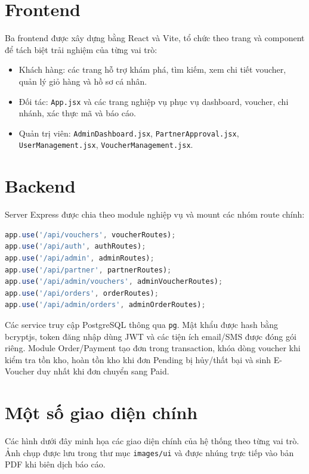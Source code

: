 \section{Frontend}

Ba frontend được xây dựng bằng React và Vite, tổ chức theo trang và component để tách biệt trải nghiệm của từng vai trò:

\begin{itemize}[leftmargin=1.2cm]
    \item Khách hàng: các trang hỗ trợ khám phá, tìm kiếm, xem chi tiết voucher, quản lý giỏ hàng và hồ sơ cá nhân.
    \item Đối tác: \texttt{App.jsx} và các trang nghiệp vụ phục vụ dashboard, voucher, chi nhánh, xác thực mã và báo cáo.
    \item Quản trị viên: \texttt{AdminDashboard.jsx}, \texttt{PartnerApproval.jsx}, \texttt{UserManagement.jsx}, \texttt{VoucherManagement.jsx}.
\end{itemize}

\section{Backend}

Server Express được chia theo module nghiệp vụ và mount các nhóm route chính:

\begin{lstlisting}[language=JavaScript]
app.use('/api/vouchers', voucherRoutes);
app.use('/api/auth', authRoutes);
app.use('/api/admin', adminRoutes);
app.use('/api/partner', partnerRoutes);
app.use('/api/admin/vouchers', adminVoucherRoutes);
app.use('/api/orders', orderRoutes);
app.use('/api/admin/orders', adminOrderRoutes);
\end{lstlisting}

Các service truy cập PostgreSQL thông qua \texttt{pg}. Mật khẩu được hash bằng bcryptjs, token đăng nhập dùng JWT và các tiện ích email/SMS được đóng gói riêng. Module Order/Payment tạo đơn trong transaction, khóa dòng voucher khi kiểm tra tồn kho, hoàn tồn kho khi đơn Pending bị hủy/thất bại và sinh E-Voucher duy nhất khi đơn chuyển sang Paid.

\section{Một số giao diện chính}

Các hình dưới đây minh họa các giao diện chính của hệ thống theo từng vai trò. Ảnh chụp được lưu trong thư mục \texttt{images/ui} và được nhúng trực tiếp vào bản PDF khi biên dịch báo cáo.

